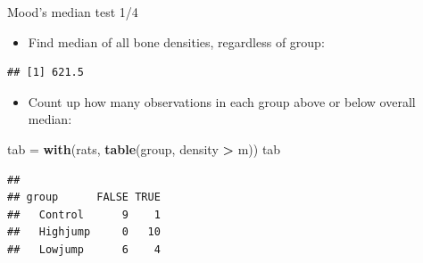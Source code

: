 \documentclass[ignorenonframetext,]{beamer}
\newenvironment{Shaded}{\begin{snugshade}}{\end{snugshade}}
\newcommand{\DataTypeTok}[1]{\textcolor[rgb]{0.13,0.29,0.53}{#1}}
\newcommand{\KeywordTok}[1]{\textcolor[rgb]{0.13,0.29,0.53}{\textbf{#1}}}
\newcommand{\NormalTok}[1]{#1}
\newcommand{\OperatorTok}[1]{\textcolor[rgb]{0.81,0.36,0.00}{\textbf{#1}}}
\newcommand{\StringTok}[1]{\textcolor[rgb]{0.31,0.60,0.02}{#1}}
\providecommand{\tightlist}{%
  \setlength{\itemsep}{0pt}\setlength{\parskip}{0pt}}
\begin{document}
\begin{frame}[fragile]{Mood's median test 1/4}
\protect\hypertarget{moods-median-test-14}{}

\begin{itemize}
\tightlist
\item
  Find median of all bone densities, regardless of group:
\end{itemize}

\small

\begin{Shaded}
\end{Shaded}

\begin{verbatim}
## [1] 621.5
\end{verbatim}

\normalsize

\begin{itemize}
\tightlist
\item
  Count up how many observations in each group above or below overall
  median:
\end{itemize}

\begin{Shaded}
\begin{Highlighting}[]
\NormalTok{tab =}\StringTok{ }\KeywordTok{with}\NormalTok{(rats, }\KeywordTok{table}\NormalTok{(group, density }\OperatorTok{>}\StringTok{ }\NormalTok{m))}
\NormalTok{tab}
\end{Highlighting}
\end{Shaded}

\begin{verbatim}
##           
## group      FALSE TRUE
##   Control      9    1
##   Highjump     0   10
##   Lowjump      6    4
\end{verbatim}

\end{frame}
\end{document}
